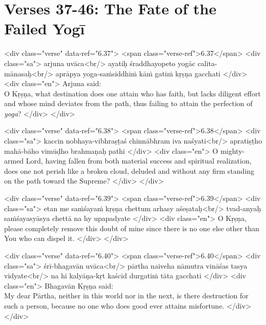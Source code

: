\section{Verses 37-46: The Fate of the Failed Yogī}\label{sec-verses-37-46-the-fate-of-the-failed-yogi}


\begin{html}
<div class="verse" data-ref="6.37">
  <span class="verse-ref">6.37</span>
  <div class="sa">
    arjuna uvāca<br/>
    ayatiḥ śraddhayopeto yogāc calita-mānasaḥ<br/>
    aprāpya yoga-saṁsiddhiṁ kāṁ gatiṁ kṛṣṇa gacchati
  </div>
  <div class="en">
    \hspace*{1em}Arjuna said: \\ O Kṛṣṇa, what destination does one attain who has faith, but lacks diligent effort and whose mind deviates from the path, thus failing to attain the perfection of \textit{yoga}?
  </div>
</div>
\end{html}



\begin{html}
<div class="verse" data-ref="6.38">
  <span class="verse-ref">6.38</span>
  <div class="sa">
    kaccin nobhaya-vibhraṣṭaś chinnābhram iva naśyati<br/>
    apratiṣṭho mahā-bāho vimūḍho brahmaṇaḥ pathi
  </div>
  <div class="en">
    O mighty-armed Lord, having fallen from both material success and spiritual realization, does one not perish like a broken cloud, deluded and without any firm standing on the path toward the Supreme?
  </div>
</div>
\end{html}



\begin{html}
<div class="verse" data-ref="6.39">
  <span class="verse-ref">6.39</span>
  <div class="sa">
    etan me saṁśayaṁ kṛṣṇa chettum arhasy aśeṣataḥ<br/>
    tvad-anyaḥ saṁśayasyāsya chettā na hy upapadyate
  </div>
  <div class="en">
    O Kṛṣṇa, please completely remove this doubt of mine since there is no one else other than You who can dispel it.
  </div>
</div>
\end{html}



\begin{html}
<div class="verse" data-ref="6.40">
  <span class="verse-ref">6.40</span>
  <div class="sa">
    śrī-bhagavān uvāca<br/>
    pārtha naiveha nāmutra vināśas tasya vidyate<br/>
    na hi kalyāṇa-kṛt kaścid durgatiṁ tāta gacchati
  </div>
  <div class="en">
    \hspace*{1em}Bhagavān Kṛṣṇa said: \\ My dear Pārtha, neither in this world nor in the next, is there destruction for such a person, because no one who does good ever attains misfortune.
  </div>
</div>
\end{html}




